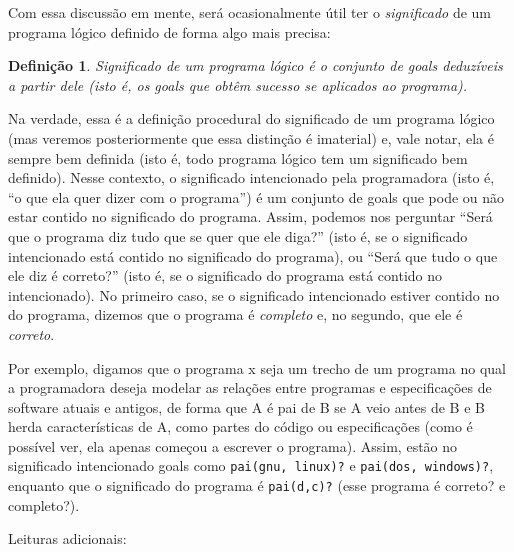 \documentclass{article}
\newtheorem{definition}{Definição}[section]
\theoremstyle{remark}
\begin{document}
Com essa discussão em mente, será ocasionalmente útil ter o \textit{significado} de um programa lógico definido de forma algo mais precisa:

  \theoremstyle{definition}
  \begin{definition}{Significado}
    de um programa lógico é o conjunto de goals deduzíveis a partir dele (isto é, os goals que obtêm sucesso se aplicados ao programa).
  \end{definition}

  Na verdade, essa é a definição procedural do significado de um programa lógico (mas veremos posteriormente que essa distinção é imaterial) e, vale notar, ela é sempre bem definida (isto é, todo programa lógico tem um significado bem definido). Nesse contexto, o significado intencionado pela programadora (isto é, ``o que ela quer dizer com o programa'') é um conjunto de goals que pode ou não estar contido no significado do programa. Assim, podemos nos perguntar ``Será que o
  programa diz tudo que se quer que ele diga?'' (isto é, se o significado intencionado está contido no significado do programa), ou ``Será que tudo o que ele diz é correto?'' (isto é, se o significado do programa está contido no intencionado). No primeiro caso, se o significado intencionado estiver contido no do programa, dizemos que o programa é \textit{completo} e, no segundo, que ele é \textit{correto}.

  Por exemplo, digamos que o programa x seja um trecho de um programa no qual a programadora deseja modelar as relações entre programas e especificações de software atuais e antigos, de forma que A é pai de B se A veio antes de B e B herda características de A, como partes do código ou especificações (como é possível ver, ela apenas começou a escrever o programa). Assim, estão no significado intencionado goals como {\tt pai(gnu, linux)?} e {\tt pai(dos, windows)?}, enquanto que o
  significado do programa é {\tt pai(d,c)?} (esse programa é correto? e completo?).


  Leituras adicionais:
\end{document}
